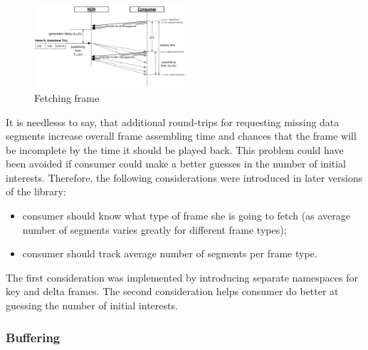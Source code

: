 \documentclass{icn/sig-alternate-2012} %
\begin{document}
\begin{figure}[t!]
\centering
\includegraphics[width=0.5\textwidth]{frame-fetch}
\vspace{-18pt}
\caption{Fetching frame}
\label{fig:pull}
\end{figure}

It is needlesss to say, that additional round-trips for requesting missing data segments increase overall frame assembling time and chances that the frame will be incomplete by the time it should be played back. This problem could have been avoided if consumer could make a better guesses in the number of initial interests. Therefore, the following considerations were introduced in later versions of the library:
\begin{itemize}
\item consumer should know what type of frame she is going to fetch (as average number of segments varies greatly for different frame types);
\item consumer should track average number of segments per frame type.
\end{itemize}

The first consideration was implemented by introducing separate namespaces for key and delta frames. The second consideration helps consumer do better at guessing the number of initial interests.

\subsubsection{Buffering}

\end{document}
